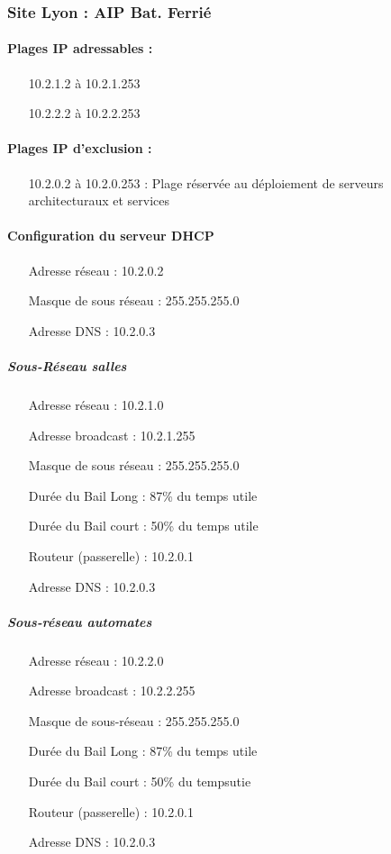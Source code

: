 \documentclass[a4paper]{article}
\begin{document}
\subsubsection{Site Lyon : AIP Bat. Ferrié}

\paragraph{Plages IP adressables :} 
\begin{itemize}
\item[10.2.1.2 à 10.2.1.253]
\item[10.2.2.2 à 10.2.2.253]
\end{itemize}

\paragraph{Plages IP d'exclusion :}
\begin{itemize}
\item[10.2.0.2 à 10.2.0.253] : Plage réservée au déploiement de serveurs architecturaux et services
\end{itemize}

\paragraph{Configuration du serveur DHCP}

\begin{itemize}
\item[Adresse réseau]: 10.2.0.2
\item[Masque de sous réseau]: 255.255.255.0
\item[Adresse DNS]: 10.2.0.3
\end{itemize}

\subparagraph{Sous-Réseau salles}
\begin{itemize}
\item[Adresse réseau]: 10.2.1.0
\item[Adresse broadcast]: 10.2.1.255
\item[Masque de sous réseau]: 255.255.255.0
\item[Durée du Bail Long]: 87\% du temps utile
\item[Durée du Bail court]: 50\% du temps utile
\item[Routeur (passerelle)]: 10.2.0.1
\item[Adresse DNS]: 10.2.0.3
\end{itemize}

\subparagraph{Sous-réseau automates}
\begin{itemize}
\item[Adresse réseau]: 10.2.2.0
\item[Adresse broadcast]: 10.2.2.255
\item[Masque de sous-réseau]: 255.255.255.0
\item[Durée du Bail Long]: 87\% du temps utile
\item[Durée du Bail court]: 50\% du tempsutie
\item[Routeur (passerelle)]: 10.2.0.1
\item[Adresse DNS]: 10.2.0.3
\end{itemize}
\end{document}
